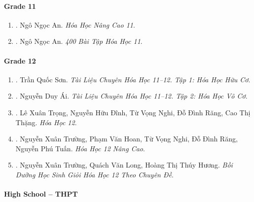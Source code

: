 \documentclass{article}
\begin{document}
\paragraph{Grade 11}

\begin{enumerate}
	\item \cite{An_Hoa_Hoc_nang_cao_11}. Ngô Ngọc An. {\it Hóa Học Nâng Cao 11}.\hfill{\sf[reading]}

	\item \cite{An_400_BT_Hoa_Hoc_11}. Ngô Ngọc An. {\it 400 Bài Tập Hóa Học 11}.\hfill{\sf[reading]}
\end{enumerate}

\paragraph{Grade 12}

\begin{enumerate}
	\item \cite{Son2021}. Trần Quốc Sơn. {\it Tài Liệu Chuyên Hóa Học 11--12. Tập 1: Hóa Học Hữu Cơ}.\hfill{\sf[reading]}

	\item \cite{Ai2022}. Nguyễn Duy Ái. {\it Tài Liệu Chuyên Hóa Học 11--12. Tập 2: Hóa Học Vô Cơ}.\hfill{\sf[reading]}

	\item \cite{SGK_Hoa_Hoc_12_co_ban}. Lê Xuân Trọng, Nguyễn Hữu Đĩnh, Từ Vọng Nghi, Đỗ Đình Răng, Cao Thị Thặng. {\it Hóa Học 12}.\hfill{\sf[reading]}

	\item \cite{SGK_Hoa_Hoc_12_nang_cao}. Nguyễn Xuân Trường, Phạm Văn Hoan, Từ Vọng Nghi, Đỗ Đình Răng, Nguyễn Phú Tuấn. {\it Hóa Học 12 Nâng Cao}.

	\item \cite{Truong_Long_Huong_bdhsg_Hoa_Hoc_12}. Nguyễn Xuân Trường, Quách Văn Long, Hoàng Thị Thúy Hương. {\it Bồi Dưỡng Học Sinh Giỏi Hóa Học 12 Theo Chuyên Đề}.\hfill{\sf[reading]}
\end{enumerate}

\paragraph{High School -- THPT}
\end{document}

